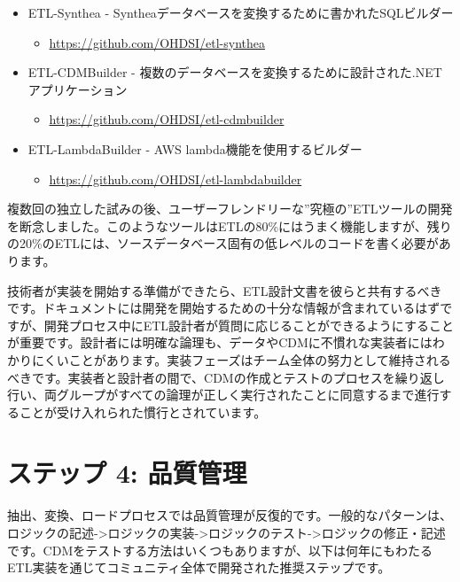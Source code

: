 \documentclass[
  11pt]{book}
\providecommand{\tightlist}{%
  \setlength{\itemsep}{0pt}\setlength{\parskip}{0pt}}
\theoremstyle{definition}
\theoremstyle{definition}
\theoremstyle{definition}
\theoremstyle{definition}
\theoremstyle{remark}
\begin{document}
\begin{itemize}
\tightlist
\item
  ETL-Synthea - Syntheaデータベースを変換するために書かれたSQLビルダー

  \begin{itemize}
  \tightlist
  \item
    \url{https://github.com/OHDSI/etl-synthea}
  \end{itemize}
\item
  ETL-CDMBuilder - 複数のデータベースを変換するために設計された.NETアプリケーション

  \begin{itemize}
  \tightlist
  \item
    \url{https://github.com/OHDSI/etl-cdmbuilder}
  \end{itemize}
\item
  ETL-LambdaBuilder - AWS lambda機能を使用するビルダー

  \begin{itemize}
  \tightlist
  \item
    \url{https://github.com/OHDSI/etl-lambdabuilder}
  \end{itemize}
\end{itemize}

複数回の独立した試みの後、ユーザーフレンドリーな''究極の''ETLツールの開発を断念しました。このようなツールはETLの80\%にはうまく機能しますが、残りの20\%のETLには、ソースデータベース固有の低レベルのコードを書く必要があります。

技術者が実装を開始する準備ができたら、ETL設計文書を彼らと共有するべきです。ドキュメントには開発を開始するための十分な情報が含まれているはずですが、開発プロセス中にETL設計者が質問に応じることができるようにすることが重要です。設計者には明確な論理も、データやCDMに不慣れな実装者にはわかりにくいことがあります。実装フェーズはチーム全体の努力として維持されるべきです。実装者と設計者の間で、CDMの作成とテストのプロセスを繰り返し行い、両グループがすべての論理が正しく実行されたことに同意するまで進行することが受け入れられた慣行とされています。

\section{ステップ 4: 品質管理}\label{ux30b9ux30c6ux30c3ux30d7-4-ux54c1ux8ceaux7ba1ux7406}

抽出、変換、ロードプロセスでは品質管理が反復的です。一般的なパターンは、ロジックの記述-\textgreater ロジックの実装-\textgreater ロジックのテスト-\textgreater ロジックの修正・記述です。CDMをテストする方法はいくつもありますが、以下は何年にもわたるETL実装を通じてコミュニティ全体で開発された推奨ステップです。 
\end{document}
